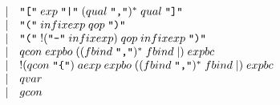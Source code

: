 \begin{align*}
\begin{array}{rcl}
    & \mid & \text{\texttt{\textquotedbl[\textquotedbl}}\; {exp}\; \text{\texttt{\textquotedbl|\textquotedbl}}\; ({qual}\; \text{\texttt{\textquotedbl,\textquotedbl}})^*\; {qual}\; \text{\texttt{\textquotedbl]\textquotedbl}} \\
    & \mid & \text{\texttt{\textquotedbl(\textquotedbl}}\; {infixexp}\; {qop}\; \text{\texttt{\textquotedbl)\textquotedbl}} \\
    & \mid & \text{\texttt{\textquotedbl(\textquotedbl}}\; ! (\text{\texttt{\textquotedbl-\textquotedbl}}\; {infixexp})\; {qop}\; {infixexp}\; \text{\texttt{\textquotedbl)\textquotedbl}} \\
    & \mid & {qcon}\; {expbo}\; (({fbind}\; \text{\texttt{\textquotedbl,\textquotedbl}})^*\; {fbind} \mid )\; {expbc} \\
    & \mid & !({qcon}\; \text{\texttt{\textquotedbl\{\textquotedbl}})\; {aexp}\; {expbo}\; (({fbind}\; \text{\texttt{\textquotedbl,\textquotedbl}})^*\; {fbind} \mid )\; {expbc} \\
    & \mid & {qvar} \\
    & \mid & {gcon}
  \end{array}
\end{align*}

